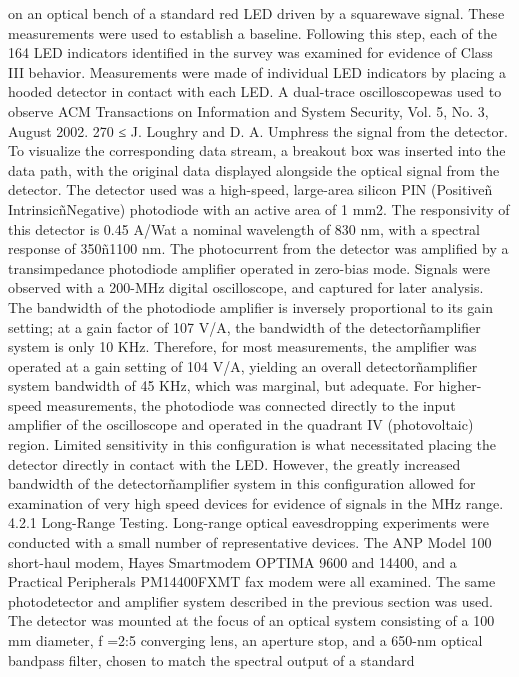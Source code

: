 on an optical bench of a standard red LED driven by a squarewave signal. These 
measurements were used to establish a baseline. Following this step, each of 
the 164 LED indicators identified in the survey was examined for evidence of 
Class III behavior. 
Measurements were made of individual LED indicators by placing a hooded 
detector in contact with each LED. A dual-trace oscilloscopewas used to observe 
ACM Transactions on Information and System Security, Vol. 5, No. 3, August 2002.
270 ≤ J. Loughry and D. A. Umphress 
the signal from the detector. To visualize the corresponding data stream, a 
breakout box was inserted into the data path, with the original data displayed 
alongside the optical signal from the detector. 
The detector used was a high-speed, large-area silicon PIN (Positiveñ 
IntrinsicñNegative) photodiode with an active area of 1 mm2. The responsivity 
of this detector is 0.45 A/Wat a nominal wavelength of 830 nm, with a spectral 
response of 350ñ1100 nm. The photocurrent from the detector was amplified 
by a transimpedance photodiode amplifier operated in zero-bias mode. Signals 
were observed with a 200-MHz digital oscilloscope, and captured for later 
analysis. 
The bandwidth of the photodiode amplifier is inversely proportional to its 
gain setting; at a gain factor of 107 V/A, the bandwidth of the detectorñamplifier 
system is only 10 KHz. Therefore, for most measurements, the amplifier was 
operated at a gain setting of 104 V/A, yielding an overall detectorñamplifier system 
bandwidth of 45 KHz, which was marginal, but adequate. For higher-speed 
measurements, the photodiode was connected directly to the input amplifier of 
the oscilloscope and operated in the quadrant IV (photovoltaic) region. Limited 
sensitivity in this configuration is what necessitated placing the detector directly 
in contact with the LED. However, the greatly increased bandwidth of 
the detectorñamplifier system in this configuration allowed for examination of 
very high speed devices for evidence of signals in the MHz range. 
4.2.1 Long-Range Testing. Long-range optical eavesdropping experiments 
were conducted with a small number of representative devices. The ANP Model 
100 short-haul modem, Hayes Smartmodem OPTIMA 9600 and 14400, and a 
Practical Peripherals PM14400FXMT fax modem were all examined. 
The same photodetector and amplifier system described in the previous section 
was used. The detector was mounted at the focus of an optical system 
consisting of a 100 mm diameter, f =2:5 converging lens, an aperture stop, and 
a 650-nm optical bandpass filter, chosen to match the spectral output of a standard 
